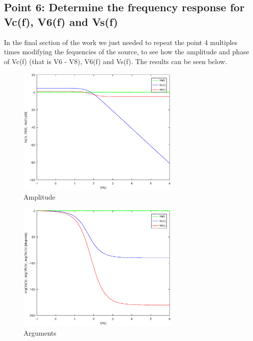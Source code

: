\subsection{Point 6: Determine the frequency response for Vc(f), V6(f) and Vs(f)}

In the final section of the work we just needed to repeat the point 4 multiples times modifying the fequencies of the source, to see how the amplitude and phase of Vc(f) (that is V6 - V8), V6(f) and Vs(f). The results can be seen below.

\begin{figure}[H]
\centering
\includegraphics[width = 8cm]{Amplitude.eps}
\caption {Amplitude}
\end{figure}

\begin{figure}[H]
\centering
\includegraphics[width = 8cm]{Arguments.eps}
\caption {Arguments}
\end{figure}
